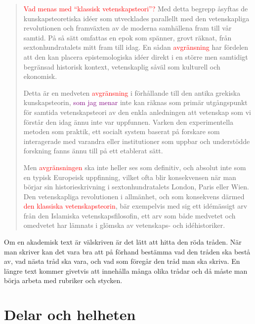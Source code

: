 \documentclass[11pt,a4paper,footinclude=true,headinclude=true]{report} %
\begin{document}
\begin{quote}
\textcolor{red}{Vad menas med ``klassisk vetenskapsteori''?} \textcolor{OliveGreen}{Med detta} begrepp åsyftas de kunskapsteoretiska idéer som utvecklades parallellt med den vetenskapliga revolutionen och framväxten av de moderna samhällena fram till vår samtid. \textcolor{OliveGreen}{På så sätt} omfattas en epok som spänner, grovt räknat, från sextonhundratalets mitt fram till idag. \textcolor{OliveGreen}{En sådan} \textcolor{red}{avgränsning} har fördelen att den kan placera epistemologiska idéer direkt i en större men samtidigt begränsad historisk kontext, vetenskaplig såväl som kulturell och ekonomisk. 

\textcolor{OliveGreen}{Detta} är en medveten \textcolor{red}{avgränsning} i förhållande till den antika grekiska kunskapsteorin, \textcolor{Purple}{som jag menar} inte kan räknas som primär utgångspunkt för samtida vetenskapsteori av den enkla anledningen att vetenskap som vi förstår den idag ännu inte var uppfunnen. Varken den experimentella metoden som praktik, ett socialt system baserat på forskare som interagerade med varandra eller institutioner som uppbar och understödde forskning fanns ännu till på ett etablerat sätt.  

\textcolor{OliveGreen}{Men} \textcolor{red}{avgränsningen} ska inte heller ses som definitiv, och absolut inte som en typisk Europeisk uppfinning, \textcolor{OliveGreen}{vilket} ofta blir konsekvensen när man börjar sin historieskrivning i sextonhundratalets London, Paris eller Wien. Den vetenskapliga revolutionen i allmänhet, och som konsekvens därmed \textcolor{red}{den klassiska vetenskapsteorin}, bär exempelvis med sig ett idémässigt arv från den Islamiska vetenskapsfilosofin, \textcolor{OliveGreen}{ett arv} som både medvetet och omedvetet har lämnats i glömska av vetenskaps- och idéhistoriker.
\end{quote}

Om en akademisk text är välskriven är det lätt att hitta den röda tråden. När man skriver kan det vara bra att på förhand bestämma vad den tråden ska bestå av, vad nästa tråd ska vara, och vad som föregår den tråd man ska skriva. En längre text kommer givetvis att innehålla många olika trådar och då måste man börja arbeta med rubriker och stycken.


\section{Delar och helheten}
\end{document}
